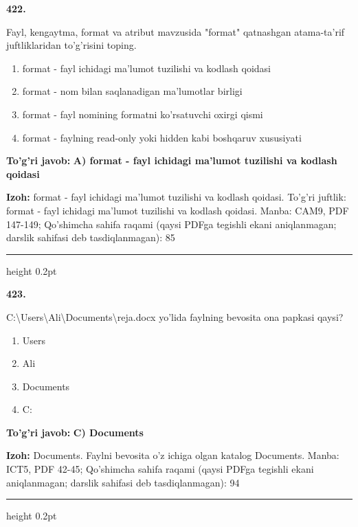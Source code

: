 \documentclass[10pt,a4paper]{article}
\begin{document}
{\bfseries\sffamily\color{ink} 422.}
\par
Fayl, kengaytma, format va atribut mavzusida "format" qatnashgan atama-ta'rif juftliklaridan to'g'risini toping.
\begin{enumerate}[label=\Alph*),leftmargin=9mm]
\item format - fayl ichidagi ma'lumot tuzilishi va kodlash qoidasi
\item format - nom bilan saqlanadigan ma'lumotlar birligi
\item format - fayl nomining formatni ko'rsatuvchi oxirgi qismi
\item format - faylning read-only yoki hidden kabi boshqaruv xususiyati
\end{enumerate}
\begin{tcolorbox}[enhanced,breakable,colback=teal!4,colframe=teal!60!black,boxrule=0.45pt,arc=1.2mm,left=2.7mm,right=2.7mm,top=1.8mm,bottom=1.8mm,before skip=2mm,after skip=2mm]
{\bfseries\sffamily\color{teal}To'g'ri javob:} \textbf{A) format - fayl ichidagi ma'lumot tuzilishi va kodlash qoidasi}
\par\smallskip
{\bfseries Izoh:} format - fayl ichidagi ma'lumot tuzilishi va kodlash qoidasi. To'g'ri juftlik: format - fayl ichidagi ma'lumot tuzilishi va kodlash qoidasi. Manba: CAM9, PDF 147-149; Qo'shimcha sahifa raqami (qaysi PDFga tegishli ekani aniqlanmagan; darslik sahifasi deb tasdiqlanmagan): 85
\end{tcolorbox}
\vspace{2mm}\hrule height 0.2pt\vspace{3mm}

{\bfseries\sffamily\color{ink} 423.}
\par
C:\textbackslash{}Users\textbackslash{}Ali\textbackslash{}Documents\textbackslash{}reja.docx yo'lida faylning bevosita ona papkasi qaysi?
\begin{enumerate}[label=\Alph*),leftmargin=9mm]
\item Users
\item Ali
\item Documents
\item C:
\end{enumerate}
\begin{tcolorbox}[enhanced,breakable,colback=teal!4,colframe=teal!60!black,boxrule=0.45pt,arc=1.2mm,left=2.7mm,right=2.7mm,top=1.8mm,bottom=1.8mm,before skip=2mm,after skip=2mm]
{\bfseries\sffamily\color{teal}To'g'ri javob:} \textbf{C) Documents}
\par\smallskip
{\bfseries Izoh:} Documents. Faylni bevosita o'z ichiga olgan katalog Documents. Manba: ICT5, PDF 42-45; Qo'shimcha sahifa raqami (qaysi PDFga tegishli ekani aniqlanmagan; darslik sahifasi deb tasdiqlanmagan): 94
\end{tcolorbox}
\vspace{2mm}\hrule height 0.2pt\vspace{3mm}
\end{document}
